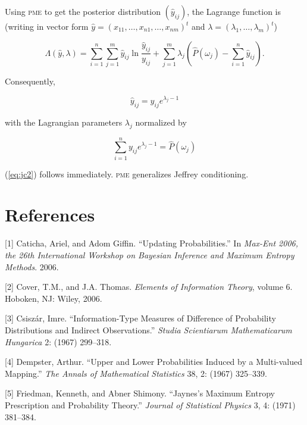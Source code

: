 {\noindent}Using \textsc{pme} to get the posterior distribution
$(\hat{y}_{ij})$, the Lagrange function is (writing in vector form
$\hat{y}=(x_{11},\ldots,x_{n1},\ldots,x_{nm})^{t}$ and
$\lambda=(\lambda_{1},\ldots,\lambda_{m})^{t}$)

\begin{equation}
  \label{eq:jclag}
  \Lambda(\hat{y},\lambda)=\sum_{i=1}^{n}\sum_{j=1}^{m}\hat{y}_{ij}\ln\frac{\hat{y}_{ij}}{y_{ij}}+\sum_{j=1}^{m}\lambda_{j}\left(\hat{P}(\omega_{j})-\sum_{i=1}^{n}\hat{y}_{ij}\right).
\end{equation}

{\noindent}Consequently,

\begin{equation}
  \label{eq:jc4}
  \hat{y}_{ij}=y_{ij}e^{\lambda_{j}-1}
\end{equation}

{\noindent}with the Lagrangian parameters $\lambda_{j}$ normalized by

\begin{equation}
  \label{eq:jc5}
  \sum_{i=1}^{n}y_{ij}e^{\lambda_{j}-1}=\hat{P}(\omega_{j})
\end{equation}

{\noindent}(\ref{eq:jc2}) follows immediately. \textsc{pme}
generalizes Jeffrey conditioning.

\section{References}
\label{References}

[1] Caticha, Ariel, and Adom Giffin. ``Updating Probabilities.'' In \emph{Max-Ent 2006, the 26th International Workshop on Bayesian Inference and Maximum Entropy Methods}. 2006.

[2] Cover, T.M., and J.A. Thomas. \emph{Elements of Information Theory}, volume 6. Hoboken, NJ: Wiley, 2006.

[3] Csisz{\'a}r, Imre. ``Information-Type Measures of Difference of Probability Distributions and Indirect Observations.'' \emph{Studia Scientiarum Mathematicarum Hungarica} 2: (1967) 299--318.

[4] Dempster, Arthur. ``Upper and Lower Probabilities Induced by a Multi-valued Mapping.'' \emph{The Annals of Mathematical Statistics} 38, 2: (1967) 325--339.

[5] Friedman, Kenneth, and Abner Shimony. ``Jaynes's Maximum Entropy Prescription and Probability Theory.'' \emph{Journal of Statistical Physics} 3, 4: (1971) 381--384.


